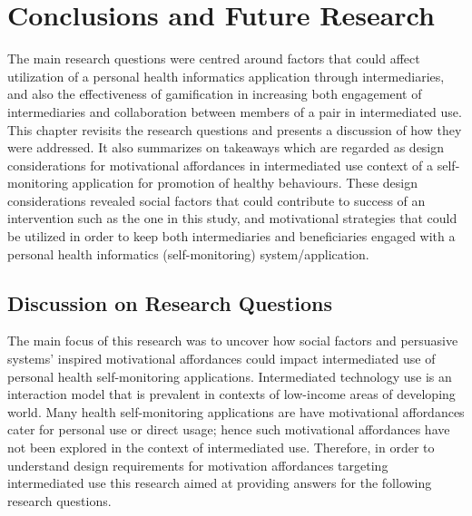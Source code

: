
\chapter{Conclusions and Future Research} %

\label{discussionchapter} %


The main research questions were centred around factors that could affect utilization of a personal health informatics application through intermediaries, and also the effectiveness of gamification in increasing both engagement of intermediaries and collaboration between members of a pair in intermediated use. This chapter revisits the research questions and presents a discussion of how they were addressed. It also summarizes on takeaways which  are regarded as design considerations for motivational affordances in intermediated use context of a self-monitoring application for promotion of healthy behaviours. These design considerations revealed social factors that could contribute to success of an intervention such as the one in this study, and motivational strategies that could be utilized in order to keep both intermediaries and beneficiaries engaged with a personal health informatics (self-monitoring) system/application.

\section{Discussion on Research Questions}
The main focus of this research was to uncover how social factors and persuasive systems' inspired motivational affordances could impact intermediated use of personal health self-monitoring applications. Intermediated technology use is an interaction model that is prevalent in contexts of low-income areas of developing world. Many health self-monitoring applications are have motivational affordances cater for personal use or direct usage; hence such motivational affordances have not been explored in the context of intermediated use. Therefore, in order to understand design requirements for motivation affordances targeting intermediated use this research aimed at providing answers for the following research questions.

